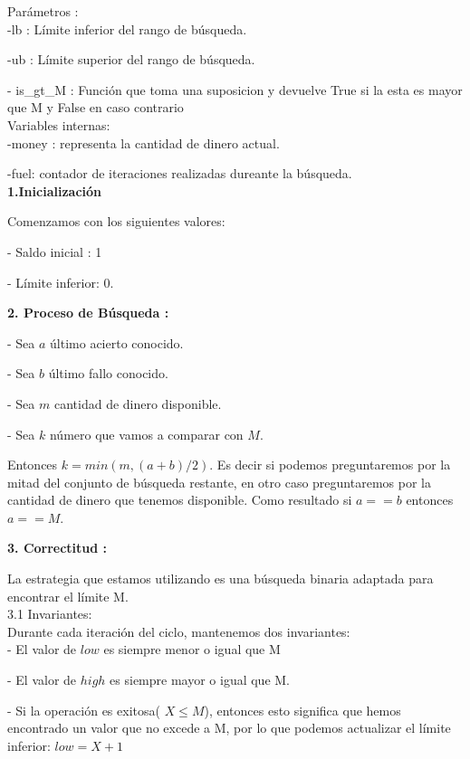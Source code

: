 \documentclass[
10pt, %
a4paper, %
oneside, %
headinclude,footinclude, %
BCOR5mm, %
]{scrartcl}
\begin{document}
Parámetros :\\

-lb : Límite inferior del rango de búsqueda.


-ub : Límite superior del rango de búsqueda.


- is_gt_M : Función que toma una suposicion y devuelve True si la esta es mayor que M y False en caso contrario\\

Variables internas: \\

-money : representa la cantidad de dinero actual.

-fuel: contador de iteraciones realizadas dureante la búsqueda. \\

\textbf{1.Inicialización}
 
Comenzamos con los siguientes valores:

- Saldo inicial : 1


- Límite inferior: 0.

\textbf{2. Proceso de Búsqueda :} 

- Sea $a$ último acierto conocido.

- Sea $b$ último fallo conocido.

- Sea $m$ cantidad de dinero disponible.

- Sea $k$ número que vamos a comparar 
con $M$.


Entonces $k = min(m, (a+b)/2)$. Es 
decir si podemos preguntaremos por la 
mitad del conjunto de búsqueda 
restante, en otro caso preguntaremos 
por la cantidad de dinero que tenemos 
disponible. Como resultado si $a == b$ 
entonces $a == M$.


\textbf{3. Correctitud :} 

La estrategia que estamos utilizando es una búsqueda binaria adaptada para encontrar el límite M.\\


3.1 Invariantes:\\

Durante cada iteración del ciclo, mantenemos dos invariantes:\\


- El valor de $low$ es siempre menor o igual que M


- El valor de $high$ es siempre mayor o igual que M.


- Si la operación es exitosa( $X \leq M$), entonces esto significa que hemos encontrado un valor que no excede a M, por lo que podemos actualizar el límite inferior: $low = X+1$
\end{document}
